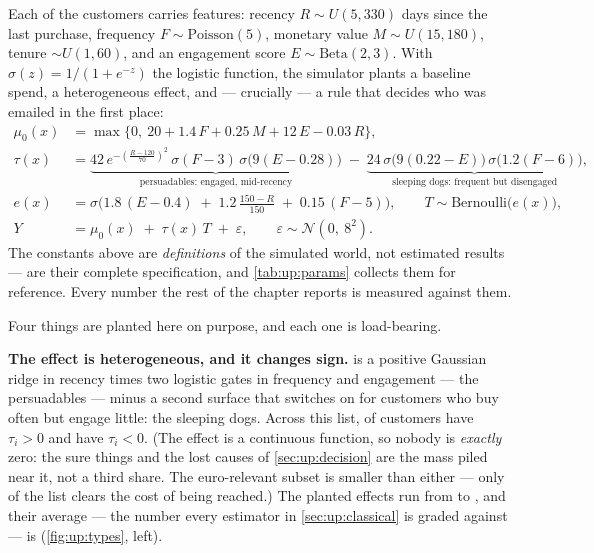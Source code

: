 Each of the \nbOneNCustomers{} customers carries \nbOneNFeatures{} features: recency
$R \sim U(5, 330)$ days since the last purchase, frequency $F \sim \text{Poisson}(5)$, monetary
value $M \sim U(15, 180)$, tenure $\sim U(1, 60)$, and an engagement score
$E \sim \text{Beta}(2, 3)$. With $\sigma(z) = 1/(1 + e^{-z})$ the logistic function, the
simulator plants a baseline spend, a heterogeneous effect, and --- crucially --- a rule that
decides who was emailed in the first place:
%
\begin{align}
  \mu_0(x) &= \max\big\{0,\ 20 + 1.4\,F + 0.25\,M + 12\,E - 0.03\,R\big\},
    \label{eq:up:mu}\\[2pt]
  \tau(x) &= \underbrace{42\, e^{-\left(\frac{R-120}{70}\right)^{2}}\,
                          \sigma(F - 3)\, \sigma\big(9(E - 0.28)\big)}_{\text{persuadables:
                          engaged, mid-recency}}
            \;-\; \underbrace{24\, \sigma\big(9(0.22 - E)\big)\,
                          \sigma\big(1.2(F - 6)\big)}_{\text{sleeping dogs:
                          frequent but disengaged}},
    \label{eq:up:tau}\\[2pt]
  e(x) &= \sigma\Big(1.8\,(E - 0.4) \;+\; 1.2\,\tfrac{150 - R}{150} \;+\; 0.15\,(F - 5)\Big),
          \qquad T \sim \text{Bernoulli}\big(e(x)\big),
    \label{eq:up:prop}\\[2pt]
  Y &= \mu_0(x) \;+\; \tau(x)\, T \;+\; \varepsilon,
       \qquad \varepsilon \sim \mathcal N\!\left(0,\ 8^{2}\right).
    \label{eq:up:y}
\end{align}
%
The constants above are \emph{definitions} of the simulated world, not estimated results ---
 are their complete specification, and \cref{tab:up:params} collects them
for reference. Every number the rest of the chapter reports is measured against them.

Four things are planted here on purpose, and each one is load-bearing.

\textbf{The effect is heterogeneous, and it changes sign.}  is a positive
Gaussian ridge in recency times two logistic gates in frequency and engagement --- the
persuadables --- minus a second surface that switches on for customers who buy often but engage
little: the sleeping dogs. Across this list, \pc{\nbOneSharePersuadable} of customers have
$\tau_i > 0$ and \pc{\nbOneShareSleeping} have $\tau_i < 0$. (The effect is a continuous function,
so nobody is \emph{exactly} zero: the sure things and the lost causes of \cref{sec:up:decision} are
the mass piled near it, not a third share. The euro-relevant subset is smaller than either ---
only \pc{\nbOneShareProfitable} of the list clears the \eur{\nbOneCost} cost of being reached.)
The planted effects run from \eur{\nbOneTauLo} to \eur{\nbOneTauHi}, and their average --- the
number every estimator in \cref{sec:up:classical} is graded against --- is \eur{\nbOneTrueAte}
(\cref{fig:up:types}, left).

